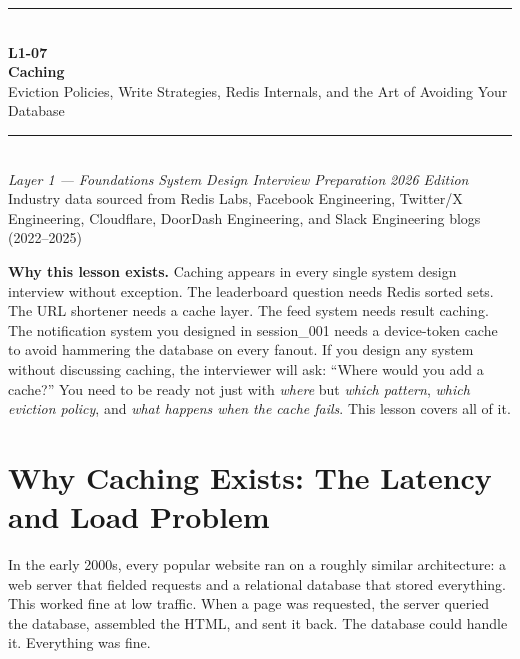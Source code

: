 \documentclass[11pt,a4paper]{article}
\begin{document}
\begin{titlepage}
\vspace*{2cm}
\begin{center}
  {\color{primary}\rule{\linewidth}{3pt}}\\[12pt]
  {\huge\bfseries\color{highlight} L1-07}\\[6pt]
  {\Huge\bfseries\color{primary} Caching}\\[10pt]
  {\large\color{primary!70} Eviction Policies, Write Strategies, Redis Internals, and the Art of Avoiding Your Database}\\[20pt]
  {\color{primary}\rule{\linewidth}{1pt}}\\[16pt]
  {\normalsize\color{primary!70}
    \textit{Layer 1 --- Foundations} \quad\textbullet\quad
    \textit{System Design Interview Preparation} \quad\textbullet\quad
    \textit{2026 Edition}
  }\\[8pt]
  {\small\color{primary!60} Industry data sourced from Redis Labs, Facebook Engineering, Twitter/X Engineering, Cloudflare, DoorDash Engineering, and Slack Engineering blogs (2022--2025)}
\end{center}
\vfill
\begin{insightbox}
\textbf{Why this lesson exists.} Caching appears in every single system design interview without exception. The leaderboard question needs Redis sorted sets. The URL shortener needs a cache layer. The feed system needs result caching. The notification system you designed in session\_001 needs a device-token cache to avoid hammering the database on every fanout. If you design any system without discussing caching, the interviewer will ask: ``Where would you add a cache?'' You need to be ready not just with \emph{where} but \emph{which pattern}, \emph{which eviction policy}, and \emph{what happens when the cache fails}. This lesson covers all of it.
\end{insightbox}
\vspace{1cm}
\tableofcontents
\end{titlepage}

\newpage

\section{Why Caching Exists: The Latency and Load Problem}

In the early 2000s, every popular website ran on a roughly similar architecture: a web server that fielded requests and a relational database that stored everything. This worked fine at low traffic. When a page was requested, the server queried the database, assembled the HTML, and sent it back. The database could handle it. Everything was fine.
\end{document}
